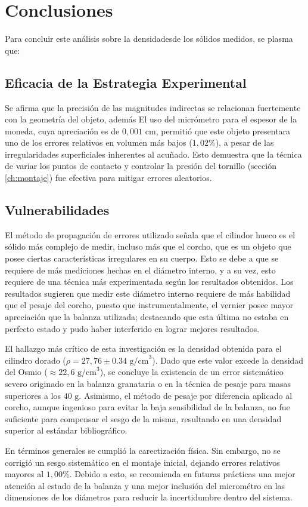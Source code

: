 \chapter{Conclusiones}
\thispagestyle{fancy}
\label{ch:conclusiones}



Para concluir este análisis sobre la densidadesde los sólidos medidos, se 
plasma que:

\section{Eficacia de la Estrategia Experimental}

Se afirma que la precisión de las magnitudes indirectas se relacionan fuertemente
con la geometría del objeto, además El uso del micrómetro para el 
espesor de la moneda, cuya apreciación es de $0,001 \text{ cm}$, 
permitió que este objeto presentara uno de los errores relativos 
en volumen más bajos ($1,02\%$), a pesar de las irregularidades 
superficiales inherentes al acuñado. Esto demuestra que la técnica
 de variar los puntos de contacto y controlar la presión del tornillo 
 (sección \ref{ch:montaje}) 
fue efectiva para mitigar errores aleatorios.

\section{Vulnerabilidades}

El método de propagación de errores utilizado señala que el cilindor hueco 
es el sólido más complejo de medir, incluso más que el corcho, que es un 
objeto que posee ciertas características irregulares en su cuerpo. Esto se 
debe a que se requiere de más mediciones hechas en el diámetro interno, y a 
su vez, esto requiere de una técnica más experimentada según los resultados obtenidos.
Los resultados sugieren que medir este diámetro interno requiere de más 
habilidad que el pesaje del corcho, puesto que instrumentalmente, el vernier
posee mayor apreciación que la balanza utilizada; destacando que esta última 
no estaba en perfecto estado y pudo haber interferido en lograr mejores 
resultados. 

El hallazgo más crítico de esta investigación es la densidad 
obtenida para el cilindro dorado ($\rho = 27,76 \pm 0.34 \text{ g/cm}^3$). 
Dado que este valor excede la densidad del Osmio ($\approx 22,6 \text{ g/cm}^3$), 
se concluye la existencia de un error sistemático severo originado en la balanza 
granataria o en la técnica de pesaje para masas superiores a los 
$40 \text{ g}$. Asimismo, el método de pesaje por diferencia aplicado 
al corcho, aunque ingenioso para evitar la baja sensibilidad de la balanza, 
no fue suficiente para compensar el sesgo de la misma, 
resultando en una densidad superior al estándar bibliográfico.

En términos generales se cumplió la carectización física. Sin embargo, no se 
corrigió un sesgo sistemático en el montaje inicial, dejando errores relativos mayores
al $1,00\%$. Debido a esto, se recomienda en futuras prácticas una mejor 
atención al estado de la balanza y una mejor inclusión del micrométro en las dimensiones
de los diámetros para reducir la incertidumbre dentro del sistema. 